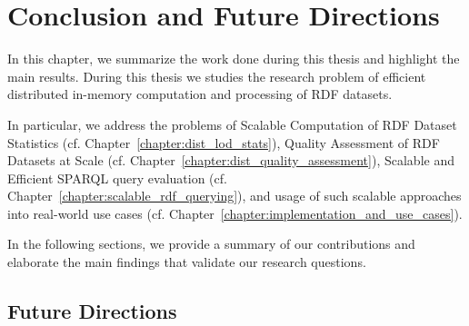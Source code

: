 \chapter{Conclusion and Future Directions}
\label{chapter:conclusion}
In this chapter, we summarize the work done during this thesis and highlight the main results.
During this thesis we studies the research problem of efficient distributed in-memory computation and processing of RDF datasets.

In particular, we address the problems of Scalable Computation of RDF Dataset Statistics (cf. Chapter~\ref{chapter:dist_lod_stats}), Quality Assessment of RDF Datasets at Scale (cf. Chapter~\ref{chapter:dist_quality_assessment}), Scalable and Efficient SPARQL query evaluation (cf. Chapter~\ref{chapter:scalable_rdf_querying}), and usage of such scalable approaches into real-world use cases (cf. Chapter~\ref{chapter:implementation_and_use_cases}).

In the following sections, we provide a summary of our contributions and elaborate the main findings that validate our research questions.

\section{Future Directions}

